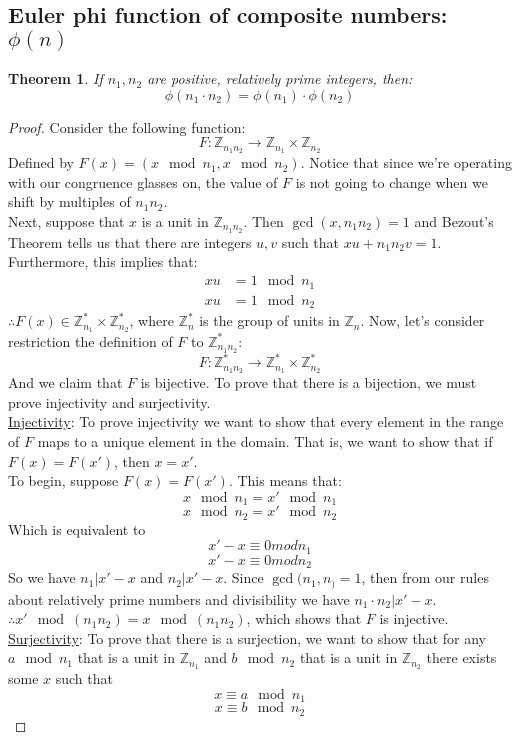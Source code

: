 \documentclass[10pt]{article}
\newcommand{\Z}{\mathbb{Z}}
\newtheorem{theorem}{Theorem}
\theoremstyle{definition}
\theoremstyle{remark}
\def\Z{\mathbb{ Z}}
\begin{document}
\subsection{Euler phi function of composite numbers: $\phi(n)$}
\begin{theorem}\label{euler_phi_composite}
If $n_1,n_2$ are positive, relatively prime integers, then: $$\phi(n_1\cdot n_2) = \phi(n_1) \cdot \phi(n_2)$$
\end{theorem}
\begin{proof}
Consider the following function: $$F : \Z_{n_1n_2} \to \Z_{n_1} \times \Z_{n_2}$$
Defined by $F(x) = (x \mod n_1, x \mod n_2)$.  Notice that since we're operating with our congruence glasses on, the value of $F$ is not going to change when we shift by multiples of $n_1n_2$.\\
Next, suppose that $x$ is a unit in $\Z_{n_1n_2}$.  Then $\gcd(x, n_1n_2) = 1$ and Bezout's Theorem tells us that there are integers $u,v$ such that $xu + n_1n_2v = 1$.  Furthermore, this implies that:
\begin{align*}
xu &= 1 \mod n_1\\
xu &= 1 \mod n_2
\end{align*}
$\therefore F(x) \in \Z^*_{n_1} \times \Z^*_{n_2}$, where $\Z^*_n$ is the group of units in $\Z_n$.
Now, let's consider restriction the definition of $F$ to $\Z^*_{n_1n_2}$:
$$F : \Z^*_{n_1n_2} \to \Z^*_{n_1} \times \Z^*_{n_2}$$
And we claim that $F$ is bijective.  To prove that there is a bijection, we must prove injectivity and surjectivity.\\
\linebreak
\underline{Injectivity}: To prove injectivity we want to show that every element in the range of $F$ maps to a unique element in the domain.  That is, we want to show that if $F(x) = F(x')$, then $x = x'$.\\
To begin, suppose $F(x) = F(x')$.  This means that:
$$x \mod n_1 = x' \mod n_1$$
$$x \mod n_2 = x' \mod n_2$$
Which is equivalent to
$$x'-x \equiv 0 mod n_1$$
$$x'-x \equiv 0 mod n_2$$
So we have $n_1|x'-x$ and $n_2|x'-x$.  Since $\gcd(n_1,n_)=1$, then from our rules about relatively prime numbers and divisibility we have $n_1 \cdot n_2 | x'-x$.\\
$\therefore x'\mod(n_1n_2) = x \mod (n_1n_2)$, which shows that $F$ is injective.\\
\linebreak
\underline{Surjectivity}: To prove that there is a surjection, we want to show that for any $a \mod n_1$ that is a unit in $\Z_{n_1}$ and $b \mod n_2$ that is a unit in $\Z_{n_2}$ there exists some $x$ such that $$x \equiv a \mod n_1$$ $$x \equiv b \mod n_2$$

\end{proof}
\end{document}
